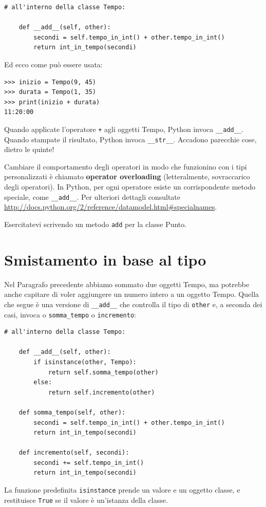 \documentclass[10pt]{book}
\begin{document}
\begin{verbatim}
# all'interno della classe Tempo:

    def __add__(self, other):
        secondi = self.tempo_in_int() + other.tempo_in_int()
        return int_in_tempo(secondi)
\end{verbatim}
%
Ed ecco come può essere usata:

\begin{verbatim}
>>> inizio = Tempo(9, 45)
>>> durata = Tempo(1, 35)
>>> print(inizio + durata)
11:20:00
\end{verbatim}
%
Quando applicate l'operatore {\tt +} agli oggetti Tempo, Python invoca
\verb"__add__".  Quando stampate il risultato, Python invoca 
\verb"__str__".  Accadono parecchie cose, dietro le quinte!

Cambiare il comportamento degli operatori in modo che funzionino con i tipi personalizzati è chiamato {\bf operator overloading} (letteralmente, sovraccarico degli operatori). In Python, per ogni operatore esiste un corrispondente metodo speciale, come
\verb"__add__".  Per ulteriori dettagli consultate
\url{http://docs.python.org/2/reference/datamodel.html#specialnames}.

Esercitatevi scrivendo un metodo {\tt add} per la classe Punto.  


\section{Smistamento in base al tipo}

Nel Paragrafo precedente abbiamo sommato due oggetti Tempo, ma potrebbe anche capitare di voler aggiungere un numero intero a un oggetto Tempo. Quella che segue è una versione di \verb"__add__"
che controlla il tipo di {\tt other} e, a seconda dei casi, invoca o
\verb"somma_tempo" o {\tt incremento}:

\begin{verbatim}
# all'interno della classe Tempo:

    def __add__(self, other):
        if isinstance(other, Tempo):
            return self.somma_tempo(other)
        else:
            return self.incremento(other)

    def somma_tempo(self, other):
        secondi = self.tempo_in_int() + other.tempo_in_int()
        return int_in_tempo(secondi)

    def incremento(self, secondi):
        secondi += self.tempo_in_int()
        return int_in_tempo(secondi)
\end{verbatim}
%
La funzione predefinita {\tt isinstance} prende un valore e un oggetto classe, e restituisce {\tt True} se il valore è un'istanza della classe.
\end{document}
